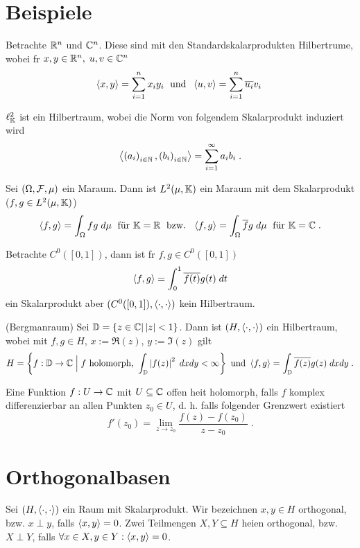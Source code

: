 \section{Beispiele}
\begin{ex}
	Betrachte \(\mathbb{R}^n\) und \(\mathbb{C}^n\). Diese sind mit den Standardskalarprodukten Hilbertr\as ume, wobei f\us r \(x, y \in \mathbb{R}^n,\; u,v \in \mathbb{C}^n\)
	\[\left\langle x,y\right\rangle = \sum_{i=1}^n x_i y_i \;\text{ und }\; \left\langle u,v\right\rangle = \sum_{i=1}^n \overline{u_i}v_i\;\]
\end{ex}
\begin{ex}
	\(\ell^2_{\mathbb{K}}\) ist ein Hilbertraum, wobei die Norm von folgendem Skalarprodukt induziert wird
	\[\left\langle\left (a_i\right )_{i\in \mathbb{N}}, \left (b_i\right )_{i\in \mathbb{N}}\right\rangle = \sum_{i=1}^\infty a_i b_i\;.\]
\end{ex}

\begin{ex}
	Sei \((\Omega, \mathcal{F}, \mu)\) ein Ma\s raum. Dann ist \(L^2(\mu, \mathbb{K})\) ein Ma\s raum mit dem Skalarprodukt (\(f,g \in L^2(\mu,\mathbb{K})\))
	\[ \left\langle f,g\right\rangle = \int_\Omega f g \;d\mu \;\text{ f{\"u}r } \mathbb{K} = \mathbb{R} \;\text{ bzw. }\; \left\langle f,g\right\rangle = \int_\Omega \overline{f}g \;d\mu \;\text{ f{\"u}r }\mathbb{K} = \mathbb{C}\;.\] 
\end{ex}

\begin{ex}
	Betrachte \(C^0([0,1])\), dann ist f\us r \(f,g\in C^0([0,1])\)
	\[ \left\langle f,g\right\rangle = \int_0^1 \overline{f(t)} g(t) \; dt\]
	ein Skalarprodukt aber \((C^0([0,1]), \left\langle\cdot,\cdot\right\rangle)\) kein Hilbertraum.
	\end{ex}
	
\begin{ex}(Bergmanraum)
	Sei \(\mathbb{D} = \left\{z \in\mathbb{C} \vert \left\lvert z \right\rvert < 1\right\}\). Dann ist \((H, \left\langle\cdot, \cdot\right\rangle)\) ein Hilbertraum, wobei mit \(f,g \in H\), \(x:= \Re(z)\), \(y:= \Im(z)\) gilt
	\[H = \left\{f:\mathbb{D} \to \mathbb{C} \;\Big\vert\; f \text{ holomorph, } \int_\mathbb{D} \left\lvert f(z) \right\rvert^2 \;dxdy < \infty\right\} \text{ und } \left\langle f,g\right\rangle = \int_\mathbb{D} \overline{f(z)} g(z)\; dx dy\;.\]
\end{ex}
\begin{rem}
	Eine Funktion \(f: U \to \mathbb{C}\) mit \(U\subseteq \mathbb{C}\) offen  hei\s t holomorph, falls $f$ komplex differenzierbar an allen Punkten \(z_0 \in U\), d. h. falls folgender Grenzwert existiert 
	\[f'(z_0) = \lim_{z\to z_0} \frac{f(z) - f(z_0)}{z-z_0}\;.\]
\end{rem}

\section{Orthogonalbasen}
\begin{definition}
	Sei \((H, \left\langle\cdot, \cdot\right\rangle)\) ein Raum mit Skalarprodukt. Wir bezeichnen \(x,y \in H\) orthogonal, bzw. \(x\perp y\), falls \(\left\langle x,y\right\rangle = 0\). Zwei Teilmengen \(X, Y \subseteq H\) hei\s en orthogonal, bzw. \(X \perp Y\), falls \(\forall x \in X, y \in Y: \left\langle x,y\right\rangle = 0\).
\end{definition}

